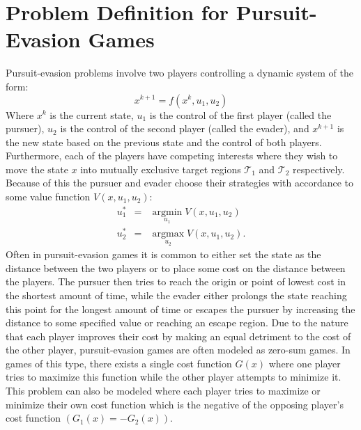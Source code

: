 \chapter{Problem Definition for Pursuit-Evasion Games}

Pursuit-evasion problems involve two players controlling a dynamic system of the form: 
\begin{equation*}
x^{k+1}=f(x^k, u_1, u_2)
\end{equation*}
Where $x^k$ is the current state, $u_1$ is the control of the first player (called the pursuer), $u_2$ is the control of the second player (called the evader), and $x^{k+1}$ is the new state based on the previous state and the control of both players. Furthermore, each of the players have competing interests where they wish to move the state $x$ into mutually exclusive target regions $\mathscr{T}_1$ and $\mathscr{T}_2$ respectively. Because of this the pursuer and evader choose their strategies with accordance to some value function $V(x,u_1,u_2)$: 
\begin{eqnarray*}
u_1^* & = & \underset{u_1}{\operatorname{argmin}}V(x,u_1,u_2)\\
u_2^* & = & \underset{u_2}{\operatorname{argmax}}V(x,u_1,u_2).
\end{eqnarray*}
Often in pursuit-evasion games it is common to either set the state as the distance between the two players or to place some cost on the distance between the players. The pursuer then tries to reach the origin or point of lowest cost in the shortest amount of time, while the evader either prolongs the state reaching this point for the longest amount of time or escapes the pursuer by increasing the distance to some specified value or reaching an escape region. Due to the nature that each player improves their cost by making an equal detriment to the cost of the other player, pursuit-evasion games are often modeled as zero-sum games. In games of this type, there exists a single cost function $G(x)$ where one player tries to maximize this function while the other player attempts to minimize it. This problem can also be modeled where each player tries to maximize or minimize their own cost function which is the negative of the opposing player's cost function $(G_1(x) = -G_2(x))$.

